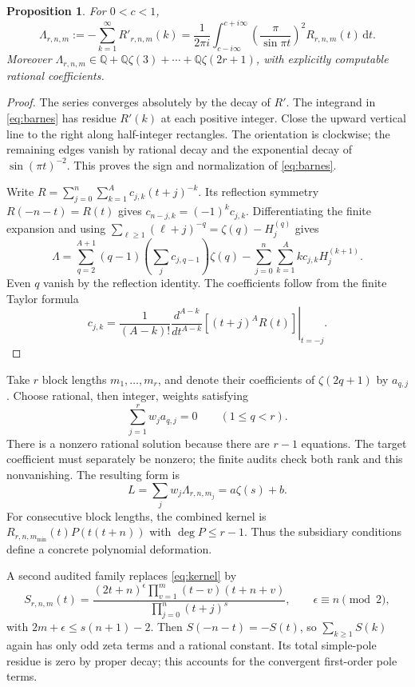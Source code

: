 \documentclass[11pt]{article}
\newtheorem{proposition}{Proposition}
\newcommand{\Q}{\mathbb Q}
\newcommand{\dd}{\,\mathrm{d}}
\newcommand{\HH}[2]{H_{#1}^{(#2)}}
\begin{document}
\begin{proposition}
For $0<c<1$,
\begin{equation}
 \Lambda_{r,n,m}:=-\sum_{k=1}^{\infty}R'_{r,n,m}(k)
 =\frac{1}{2\pi i}\int_{c-i\infty}^{c+i\infty}
       \left(\frac{\pi}{\sin\pi t}\right)^2R_{r,n,m}(t)\dd t.
 \label{eq:barnes}
\end{equation}
Moreover $\Lambda_{r,n,m}\in
\Q+\Q\zeta(3)+\cdots+\Q\zeta(2r+1)$, with explicitly computable
rational coefficients.
\end{proposition}
\begin{proof}
The series converges absolutely by the decay of $R'$.
The integrand in \eqref{eq:barnes} has residue $R'(k)$ at each positive
integer. Close the upward vertical line to the right along half-integer
rectangles. The orientation is clockwise; the remaining edges vanish by
rational decay and the exponential decay of $\sin(\pi t)^{-2}$.
This proves the sign and normalization of \eqref{eq:barnes}.

Write $R=\sum_{j=0}^n\sum_{k=1}^A c_{j,k}(t+j)^{-k}$.
Its reflection symmetry $R(-n-t)=R(t)$ gives
$c_{n-j,k}=(-1)^kc_{j,k}$. Differentiating the finite expansion and using
$\sum_{\ell\ge1}(\ell+j)^{-q}=\zeta(q)-H_j^{(q)}$ gives
\[
 \Lambda=\sum_{q=2}^{A+1}(q-1)\left(\sum_jc_{j,q-1}\right)\zeta(q)
          -\sum_{j=0}^n\sum_{k=1}^A k c_{j,k}\HH{j}{k+1}.
\]
Even $q$ vanish by the reflection identity.
The coefficients follow from the finite Taylor formula
\[
 c_{j,k}=\frac1{(A-k)!}
 \left.\frac{d^{A-k}}{dt^{A-k}}[(t+j)^A R(t)]\right|_{t=-j}.
\]
\end{proof}

Take $r$ block lengths $m_1,\ldots,m_r$, and denote their coefficients of
$\zeta(2q+1)$ by $a_{q,j}$. Choose rational, then integer, weights satisfying
\[
 \sum_{j=1}^r w_j a_{q,j}=0\qquad(1\le q<r).
\]
There is a nonzero rational solution because there are $r-1$ equations.
The target coefficient must separately be nonzero; the finite audits check
both rank and this nonvanishing. The resulting form is
\[
 L=\sum_jw_j\Lambda_{r,n,m_j}=a\zeta(s)+b.
\]
For consecutive block lengths, the combined kernel is
$R_{r,n,m_{\min}}(t)P(t(t+n))$ with $\deg P\le r-1$.
Thus the subsidiary conditions define a concrete polynomial deformation.

A second audited family replaces \eqref{eq:kernel} by
\[
 S_{r,n,m}(t)=
 \frac{(2t+n)^\epsilon\prod_{v=1}^{m}(t-v)(t+n+v)}
      {\prod_{j=0}^{n}(t+j)^s},\qquad \epsilon\equiv n\pmod2,
\]
with $2m+\epsilon\le s(n+1)-2$.
Then $S(-n-t)=-S(t)$, so $\sum_{k\ge1}S(k)$ again has only odd zeta
terms and a rational constant. Its total simple-pole residue is zero
by proper decay; this accounts for the convergent first-order pole terms.
\end{document}
